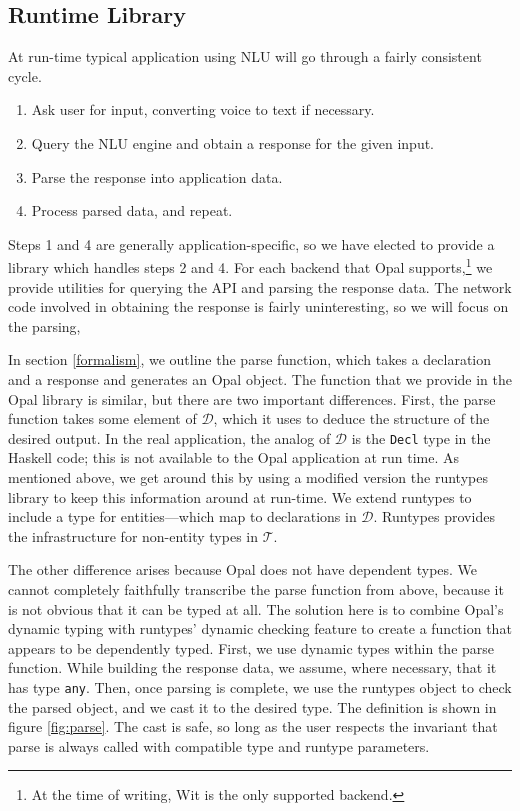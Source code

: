 \documentclass[twocolumn]{article}
\newcommand{\ts}[1]{\texttt{#1}}
\newcommand{\hs}[1]{\texttt{#1}}
\newcommand{\fcy}[1]{\mathcal{#1}}
\begin{document}
\subsection{Runtime Library}
At run-time typical application using NLU will go through a fairly consistent
cycle.
\begin{enumerate}
\item Ask user for input, converting voice to text if necessary.
\item Query the NLU engine and obtain a response for the given input.
\item Parse the response into application data.
\item Process parsed data, and repeat.
\end{enumerate}
Steps 1 and 4 are generally application-specific, so we have elected to provide
a library which handles steps 2 and 4. For each backend that Opal
supports,\footnote{At the time of writing, Wit is the only supported backend.}
we provide utilities for querying the API and parsing the response data. The
network code involved in obtaining the response is fairly uninteresting, so we
will focus on the parsing,

In section \ref{formalism}, we outline the parse function, which takes a
declaration and a response and generates an Opal object. The function that we
provide in the Opal library is similar, but there are two important differences.
First, the parse function takes some element of $\fcy{D}$, which it uses to
deduce the structure of the desired output. In the real application, the analog
of $\fcy{D}$ is the \hs{Decl} type in the Haskell code; this is not available to
the Opal application at run time. As mentioned above, we get around this by
using a modified version the runtypes library to keep this information around at
run-time. We extend runtypes to include a type for entities---which map to
declarations in $\fcy{D}$. Runtypes provides the infrastructure for non-entity
types in $\fcy{T}$.

The other difference arises because Opal does not have dependent types. We
cannot completely faithfully transcribe the parse function from above, because
it is not obvious that it can be typed at all. The solution here is to combine
Opal's dynamic typing with runtypes' dynamic checking feature to create a
function that appears to be dependently typed. First, we use dynamic types
within the parse function. While building the response data, we assume, where
necessary, that it has type \ts{any}. Then, once parsing is complete, we use the
runtypes object to check the parsed object, and we cast it to the desired type.
The definition is shown in figure \ref{fig:parse}. The cast is safe, so long as
the user respects the invariant that parse is always called with compatible type
and runtype parameters.
\end{document}
